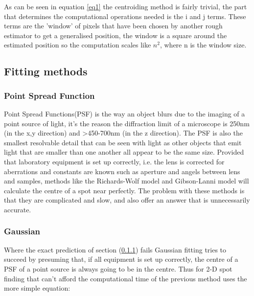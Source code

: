 \documentclass[aps,pra,a4paper,nofootinbib,onecolumn,tightenlines,longbibliography,12pt,amsfonts,amssymb,amsmath,floatfix]{revtex4-2} %
\begin{document}
  As can be seen in equation \ref{eq1} the centroiding method is fairly trivial, 
  the part that determines the computational operations needed is the i and j terms. 
  These terms are the 'window' of pixels that have been chosen by another rough estimator 
  to get a generalised position, the window is a square around the estimated position so 
  the computation scales like $n^2$, where n is the window size.\cite{stone1989comparison}
  
  \subsection{Fitting methods} %
  \label{sub:Various fitting methods}

  \subsubsection{Point Spread Function} %
    \label{ssub:Point Spread Function}
    
    Point Spread Functions(PSF) is the way an object blurs due to the imaging of a point 
    source of light, it's the reason the diffraction limit of a microscope is 250nm (in the
    x,y direction) and >450-700nm (in the z direction). The PSF is also the smallest resolvable
    detail that can be seen with light as other objects that emit light that are smaller than 
    one another all appear to be the same size. Provided that laboratory equipment is set up correctly, 
    i.e. the lens is corrected for aberrations and constants are known such as aperture and angels 
    between lens and samples, methods like the Richards-Wolf model and Gibson-Lanni model will calculate
    the centre of a spot near perfectly. The problem with these methods is that they are complicated and 
    slow, and also offer an answer that is unnecessarily accurate. \cite{richards1959electromagnetic}\cite{galbraith2011super}\cite{small2014fluorophore}


    \subsubsection{Gaussian} %
    \label{ssub:Gaussian}

    Where the exact prediction of section (\ref{ssub:Point Spread Function}) fails Gaussian fitting tries to succeed 
    by presuming that, if all equipment is set up correctly, the centre of a PSF of a point source is 
    always going to be in the centre. Thus for 2-D spot finding that can't afford the computational time of 
    the previous method uses the more simple equation:
\end{document}
